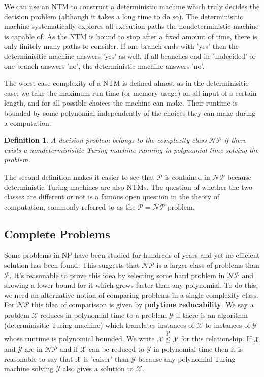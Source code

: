 \documentclass[11pt]{article}
\newtheorem{definition}{Definition}
\newcommand\leqp{\stackrel{\mathclap{\normalfont\mbox{P}}}{\leq}}
\begin{document}
	\par 
	We can use an NTM to construct a deterministic machine which truly decides the decision problem (although it takes a long time to do so). The determinisitic machine systematically explores all execution paths the nondeterministic machine is capable of. As the NTM is bound to stop after a fixed amount of time, there is only finitely many paths to consider. If one branch ends with 'yes' then the determinisitic machine answers 'yes' as well. If all branches end in 'undecided' or one branch answers 'no', the deterministic machine answers 'no'.
	
	\par 
	The worst case complexity of a NTM is defined almost as in the determinisitic case: we take the maximum run time (or memory usage) on all input of a certain length, and for all possible choices the machine can make. Their runtime is bounded by some polynomial independently of the choices they can make during a computation.
	
	\begin{definition}
		A decision problem belongs to the complexity class $\mathcal{NP}$ if there exists a nondeterminisitic Turing machine running in polynomial time solving the problem.
	\end{definition}
	
	The second definition makes it easier to see that $\mathcal{P}$ is contained in $\mathcal{NP}$ because deterministic Turing machines are also NTMs. The question of whether the two classes are different or not is a famous open question in the theory of computation, commonly referred to as the $\mathcal{P} = \mathcal{NP}$ problem.
	
	\subsection{Complete Problems}
	Some problems in NP have been studied for hundreds of years and yet no efficient solution has been found. This suggests that $\mathcal{NP}$ is a larger class of problems than $\mathcal{P}$. It's reasonable to prove this idea by selecting some hard problem in $\mathcal{NP}$ and showing a lower bound for it which grows faster than any polynomial. To do this, we need an alternative notion of comparing problems in a single complexity class. For $\mathcal{NP}$ this idea of comparisson is given by \textbf{polytime reducability}. We say a problem $\mathcal{X}$ reduces in polynomial time to a problem $\mathcal{Y}$ if there is an algorithm (determinisitic Turing machine) which translates instances of $\mathcal{X}$ to instances of $\mathcal{Y}$ whose runtime is polynomial bounded. We write $\mathcal{X} \leqp \mathcal{Y}$ for this relationship. If $\mathcal{X}$ and $\mathcal{Y}$ are in $\mathcal{NP}$ and if $\mathcal{X}$ can be reduced to $\mathcal{Y}$ in polynomial time then it is reasonable to say that $\mathcal{X}$ is 'eaiser' than $\mathcal{Y}$ because any polynomial Turing machine solving $\mathcal{Y}$ also gives a solution to $\mathcal{X}$.
	
\end{document}
